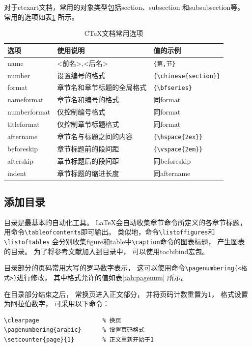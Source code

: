 \documentclass{ctexart}
\numberwithin{equation}{section}			%
\begin{document}
	对于ctexart文档，常用的对象类型包括section、subsection
	和subsubsection等。
	常用的选项如表\ref{tab:ctexopt} 所示。
	
	\begin{table}
		\centering
		\caption{C\TeX 文档常用选项}
		\label{tab:ctexopt}
		\begin{tabular}{lll}
			\toprule
			选项 & 使用说明 & 值的示例 \\
			\midrule
			name & {<前名>,<后名>} & \verb|{第,节}| \\
			number & 设置编号的格式 & \verb|{\chinese{section}}| \\
			format & 章节名和章节标题的全局格式 & \verb|{\bfseries}| \\
			nameformat & 章节名和编号的格式 & 同format \\
			numberformat & 仅控制编号格式 & 同format \\
			titleformat & 仅控制章节标题格式 & 同format\\
			aftername & 章节名与标题之间的内容 & \verb|{\hspace{2ex}}| \\
			beforeskip & 章节标题前的段间距 & \verb|{\vspace{2em}}| \\
			afterskip & 章节标题后的段间距 & 同beforeskip \\
			indent & 章节标题的缩进长度 & 同aftername \\
			\bottomrule
		\end{tabular}
	\end{table}
	
	\subsection{添加目录}
	目录是最基本的自动化工具。
	\LaTeX 会自动收集章节命令所定义的各章节标题，
	用命令\verb|\tableofcontents|即可输出。
	类似地，命令\verb|\listoffigures|和\verb|\listoftables|
	会分别收集figure和table中\verb|\caption|命令的图表标题，
	产生图表的目录。
	为了将参考文献加入到目录中，
	可以使用tocbibind宏包。
	
	目录部分的页码常用大写的罗马数字表示，
	这可以使用命令\verb|\pagenumbering{<格式>}|进行修改，
	其中格式允许的值如表\ref{tab:pagenum} 所示。
	
	在目录部分结束之后，
	常换页进入正文部分，
	并将页码计数重置为1，
	格式设置为阿拉伯数字，
	可采用以下命令：
	
\begin{lstlisting}
\clearpage					% 换页
\pagenumbering{arabic}		% 设置页码格式
\setcounter{page}{1}		% 正文重新开始于1
\end{lstlisting}
	
\end{document}
